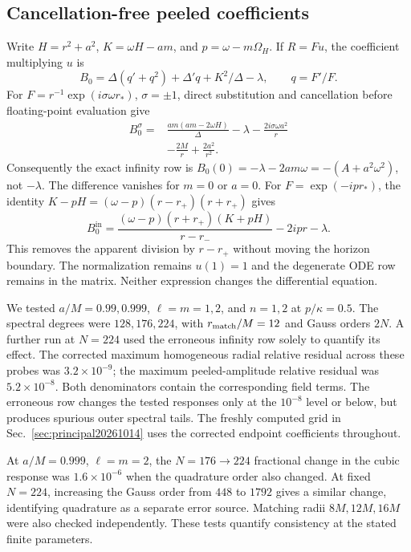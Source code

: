 \documentclass[aps,prd,twocolumn,10pt,nofootinbib,superscriptaddress,floatfix]{revtex4-2}
\begin{document}
\subsection{Cancellation-free peeled coefficients}

Write $H=r^2+a^2$, $K=\omega H-am$, and
$p=\omega-m\Omega_H$.  If $R=Fu$, the coefficient multiplying $u$ is
\begin{equation}
B_0=\Delta(q'+q^2)+\Delta' q+K^2/\Delta-\lambda,
\qquad q=F'/F.
\end{equation}
For $F=r^{-1}\exp(i\sigma\omega r_*)$, $\sigma=\pm1$, direct substitution
and cancellation before floating-point evaluation give
\begin{equation}
\begin{split}
B_0^{\sigma}={}&\frac{am(am-2\omega H)}{\Delta}-\lambda
-\frac{2i\sigma\omega a^2}{r}\\
&-\frac{2M}{r}+\frac{2a^2}{r^2}.
\end{split}
\label{eq:outerfactored20261008}
\end{equation}
Consequently the exact infinity row is
$B_0(0)=-\lambda-2am\omega=-(A+a^2\omega^2)$, not $-\lambda$.
The difference vanishes for $m=0$ or $a=0$.
For $F=\exp(-ipr_*)$, the identity
$K-pH=(\omega-p)(r-r_+)(r+r_+)$ gives
\begin{equation}
B_0^{\mathrm{in}}=
\frac{(\omega-p)(r+r_+)(K+pH)}{r-r_-}
-2ipr-\lambda.
\label{eq:innerfactored20261008}
\end{equation}
This removes the apparent division by $r-r_+$ without moving the horizon
boundary.  The normalization remains $u(1)=1$ and the degenerate ODE row
remains in the matrix.  Neither expression changes the differential equation.

We tested $a/M=0.99,0.999$, $\ell=m=1,2$, and $n=1,2$ at
$p/\kappa=0.5$.  The spectral degrees were $128,176,224$, with
$r_{\rm match}/M=12$ and Gauss orders $2N$.  A further run at $N=224$
used the erroneous infinity row solely to quantify its effect.  The
corrected maximum homogeneous radial relative residual across these probes
was $3.2\times10^{-9}$; the maximum peeled-amplitude relative residual was
$5.2\times10^{-8}$.  Both denominators contain the corresponding field
terms.  The erroneous row changes the tested responses only at the
$10^{-8}$ level or below, but produces spurious outer spectral tails.
The freshly computed grid in Sec.~\ref{sec:principal20261014} uses
the corrected endpoint coefficients throughout.

At $a/M=0.999$, $\ell=m=2$, the $N=176\to224$ fractional change in the
cubic response was $1.6\times10^{-6}$ when the quadrature order also changed.
At fixed $N=224$, increasing the Gauss order from $448$ to $1792$ gives a
similar change, identifying quadrature as a separate error source.
Matching radii $8M,12M,16M$ were also checked independently.
These tests quantify consistency at the stated finite parameters.
\end{document}
